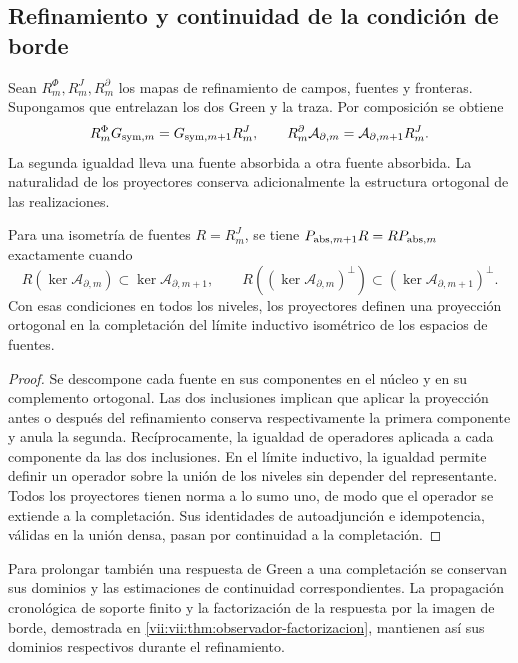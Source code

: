 \subsection{Refinamiento y continuidad de la condición de borde}
\label{vii:vii:subsec:refinamiento-absorcion}

Sean \(R_m^\Phi,R_m^J,R_m^\partial\) los mapas de refinamiento de
campos, fuentes y fronteras. Supongamos que entrelazan los dos Green y la
traza. Por composición se obtiene
\begin{equation}
 R_m^\Phi G_{{\rm sym},m}=G_{{\rm sym},m+1}R_m^J,\qquad
 R_m^\partial\mathcal A_{\partial,m}
 =\mathcal A_{\partial,m+1}R_m^J.
 \label{vii:vii:eq:refinamiento-lectura-absorcion}
\end{equation}
La segunda igualdad lleva una fuente absorbida a otra fuente absorbida.
La naturalidad de los proyectores conserva adicionalmente la estructura
ortogonal de las realizaciones.

\begin{proposition}
\label{vii:vii:prop:naturalidad-proyeccion-absorcion}
Para una isometría de fuentes \(R=R_m^J\), se tiene
\(P_{{\rm abs},m+1}R=RP_{{\rm abs},m}\) exactamente cuando
\[
 R(\ker\mathcal A_{\partial,m})
       \subset\ker\mathcal A_{\partial,m+1},\qquad
 R((\ker\mathcal A_{\partial,m})^\perp)
       \subset(\ker\mathcal A_{\partial,m+1})^\perp.
\]
Con esas condiciones en todos los niveles, los proyectores definen una
proyección ortogonal en la completación del límite inductivo isométrico
de los espacios de fuentes.
\end{proposition}
\begin{proof}
Se descompone cada fuente en sus componentes en el núcleo y en su
complemento ortogonal. Las dos inclusiones implican que aplicar la
proyección antes o después del refinamiento conserva respectivamente la
primera componente y anula la segunda. Recíprocamente, la igualdad de
operadores aplicada a cada componente da las dos inclusiones.
En el límite inductivo, la igualdad permite definir un operador sobre la
unión de los niveles sin depender del representante. Todos los proyectores
tienen norma a lo sumo uno, de modo que el operador se extiende a la
completación. Sus identidades de autoadjunción e idempotencia, válidas en
la unión densa, pasan por continuidad a la completación.
\end{proof}

Para prolongar también una respuesta de Green a una completación se
conservan sus dominios y las estimaciones de continuidad correspondientes.
La propagación cronológica de soporte finito y la factorización de la
respuesta por la imagen de borde, demostrada en
\ref{vii:vii:thm:observador-factorizacion}, mantienen así sus dominios
respectivos durante el refinamiento.

